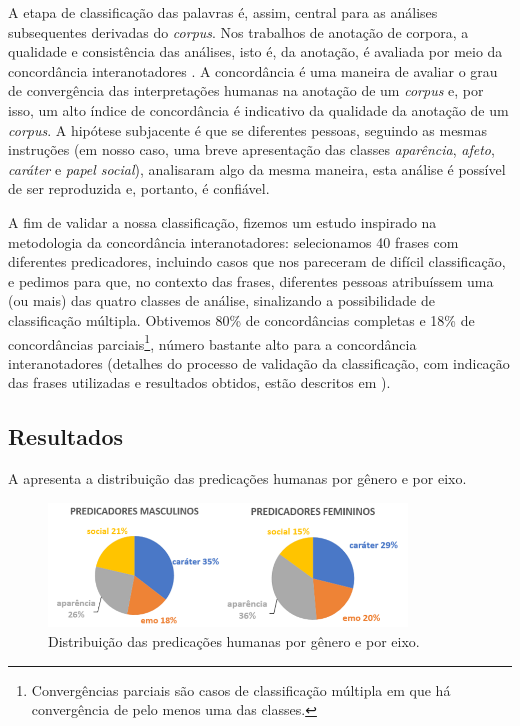 \documentclass[portuguese]{textolivre}
\begin{document}
A etapa de classificação das palavras é, assim, central para as análises subsequentes derivadas do \textit{corpus}. Nos trabalhos de anotação de corpora, a qualidade e consistência das análises, isto é, da anotação, é avaliada por meio da concordância interanotadores \cite{artstein2017}. A concordância é uma maneira de avaliar o grau de convergência das interpretações humanas na anotação de um \textit{corpus} e, por isso, um alto índice de concordância é indicativo da qualidade da anotação de um \textit{corpus}. A hipótese subjacente é que se diferentes pessoas, seguindo as mesmas instruções (em nosso caso, uma breve apresentação das classes \textit{aparência}, \textit{afeto}, \textit{caráter} e \textit{papel social}), analisaram algo da mesma maneira, esta análise é possível de ser reproduzida e, portanto, é confiável.

A fim de validar a nossa classificação, fizemos um estudo inspirado na metodologia da concordância interanotadores: selecionamos 40 frases com diferentes predicadores, incluindo casos que nos pareceram de difícil classificação, e pedimos para que, no contexto das frases, diferentes pessoas atribuíssem uma (ou mais) das quatro classes de análise, sinalizando a possibilidade de classificação múltipla. Obtivemos 80\% de concordâncias completas e 18\% de concordâncias parciais\footnote{Convergências parciais são casos de classificação múltipla em que há convergência de pelo menos uma das classes.}, número bastante alto para a concordância interanotadores (detalhes do processo de validação da classificação, com indicação das frases utilizadas e resultados obtidos, estão descritos em \textcite{silva2021}).


\subsection{Resultados}\label{sec-fmt-manuscrito}
A  apresenta a distribuição das predicações humanas por gênero e por eixo.

\begin{figure}[htbp]
 \centering
 \includegraphics[width=0.85\textwidth]{Fig2.png}
 \caption{Distribuição das predicações humanas por gênero e por eixo.}
 \label{fig2}
\end{figure}
\end{document}
